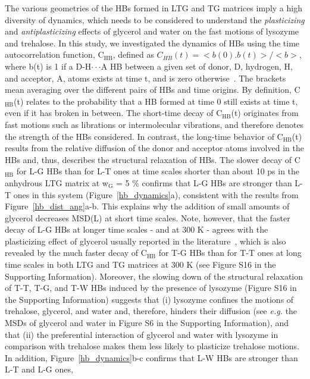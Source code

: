 \documentclass[journal=jpcbfk,manuscript=article]{achemso}
\begin{document}
\begin{singlespacing}
The various geometries of the HBs formed in LTG and TG matrices imply a high diversity of dynamics, which needs to
be considered to understand the \textit{plasticizing} and \textit{antiplasticizing} effects of glycerol and water on 
the fast motions of lysozyme and trehalose. In this study, we investigated the dynamics of HBs using the time autocorrelation
function, C$_{\textrm{HB}}$, defined as $C_{HB}(t)=<b(0).b(t)>/<b>$, where b(t) is 1 if a 
D-H$\cdot\cdot\cdot$A HB between a given set of donor, D, hydrogen, H, and acceptor, A, atoms exists at time t, and is zero 
otherwise~\cite{Luzar1996}. The brackets mean averaging over the different pairs of HBs and time origins. By definition, 
C$_{\textrm{HB}}$(t) relates to the probability that a HB formed at time 0 still exists at time t, even if it has broken 
in between. The short-time decay of C$_{\textrm{HB}}$(t) originates from fast motions such as librations or intermolecular 
vibrations, and therefore denotes the strength of the HBs considered. In contrast, the long-time behavior of
C$_{\textrm{HB}}$(t) results from the relative diffusion of the donor and acceptor atoms involved in the HBs and, thus, 
describes the structural relaxation of HBs. The slower decay of C$_{\textrm{HB}}$ for L-G HBs than for L-T ones
at time scales shorter than about 10 ps in the anhydrous LTG matrix at w$_{\textrm{G}}$ = 5 \% confirms that L-G HBs 
are stronger than L-T ones in this system (Figure~\ref{hb_dynamics}a), consistent with the results from Figure~\ref{hb_dist_ang}a-b. 
This explains why the addition of small amounts of glycerol decreases MSD(L) at short time scales. Note, however, that 
the faster decay of L-G HBs at longer time scales - and at 300 K - agrees with the plasticizing effect of glycerol usually reported in 
the literature~\cite{Lourdin1998,Verbeek2010}, which is also revealed by the much faster decay of C$_{\textrm{HB}}$ for T-G HBs 
than for T-T ones at long time scales in both LTG and TG matrices at 300 K (see Figure S16 in the Supporting Information).
Moreover, the slowing down of the structural relaxation of T-T, T-G, and T-W HBs induced by the presence of lysozyme 
(Figure S16 in the Supporting Information) suggests that (i) lysozyme confines the motions of trehalose, glycerol, and water 
and, therefore, hinders their diffusion (see \textit{e.g.} the MSDs of glycerol and water in Figure S6 in the Supporting Information), 
and that (ii) the preferential interaction of glycerol and water with lysozyme in comparison with trehalose makes them less likely 
to plasticize trehalose motions. In addition, Figure~\ref{hb_dynamics}b-c confirms that L-W HBs are stronger than L-T and L-G ones, 

\end{singlespacing}
\end{document}
